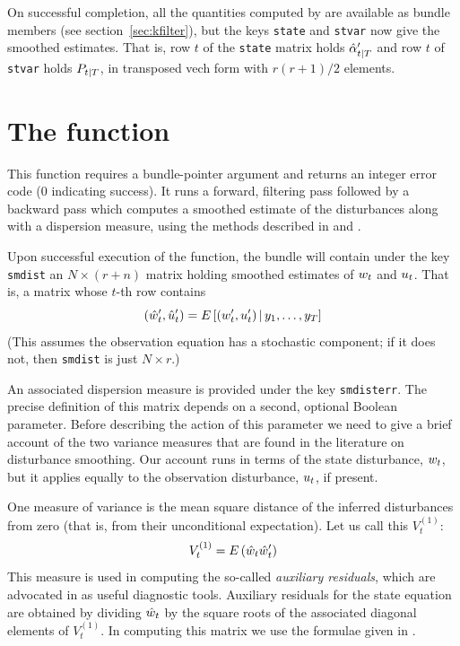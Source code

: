 On successful completion, all the quantities computed by
 are available as bundle members (see
section~\ref{sec:kfilter}), but the keys \texttt{state} and
\texttt{stvar} now give the smoothed estimates.  That is, row $t$ of
the \texttt{state} matrix holds $\hat{\alpha}_{t|T}'$ and row $t$
of \texttt{stvar} holds $P_{t|T}$, in transposed vech form
with $r(r+1)/2$ elements.

\section{The  function}
\label{sec:kdsmooth}

This function requires a bundle-pointer argument and returns an
integer error code (0 indicating success).  It runs a forward,
filtering pass followed by a backward pass which computes a smoothed
estimate of the disturbances along with a dispersion measure, using
the methods described in \cite{koopman93} and \cite{koopman-etal99}.

Upon successful execution of the function, the bundle will contain
under the key \texttt{smdist} an $N \times (r+n)$ matrix holding
smoothed estimates of $w_t$ and $u_t$. That is, a matrix
whose $t$-th row contains
\[
(\hat{w}_t' , \hat{u}_t')
 = E\left[ (w_t' , u_t') \,| \,
   y_1, \ldots, y_T \right]
\]
(This assumes the observation equation has a stochastic component; if
it does not, then \texttt{smdist} is just $N \times r$.)

An associated dispersion measure is provided under the key
\texttt{smdisterr}. The precise definition of this matrix depends on a
second, optional Boolean parameter. Before describing the action of
this parameter we need to give a brief account of the two variance
measures that are found in the literature on disturbance
smoothing. Our account runs in terms of the state disturbance,
$w_t$, but it applies equally to the observation disturbance,
$u_t$, if present.

One measure of variance is the mean square distance of the inferred
disturbances from zero (that is, from their unconditional
expectation). Let us call this $V^{(1)}_t$:
\[
V^{(1)}_t = E\left(\hat{w}_t\hat{w}_t'\right)
\]
This measure is used in computing the so-called \emph{auxiliary
  residuals}, which are advocated in \cite{durbin-koopman12} as useful
diagnostic tools. Auxiliary residuals for the state equation are
obtained by dividing $\hat{w}_t$ by the square roots of the
associated diagonal elements of $V^{(1)}_t$. In computing this matrix
we use the formulae given in \citet[section 4.4]{koopman-etal99}.


